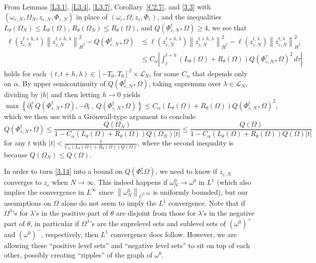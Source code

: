 \documentclass[reqno,centertags,12pt]{amsart}
\theoremstyle{definition}
\numberwithin{equation}{section}
\newcommand{\abs}[1]{\left\lvert#1\right\rvert}
\newcommand{\norm}[1]{\left\|#1\right\|}
\newcommand{\set}[1]{\left\{ #1 \right\}}
\newcommand{\eps}{\varepsilon}
\newcommand{\tht}{\theta}
\begin{document}
From Lemmas \ref{L3.1}, \ref{L3.4}, \ref{L3.7}, Corollary~\ref{C2.7}, and \eqref{3.3} with
$(\omega_{\eps,N},\Omega_{N},z_{\eps,N},\Phi_{\eps,N})$ in place of
$(\omega_{\eps},\Omega,z_{\eps}, \Phi_{\eps})$,
and the inequalities $L_{\tht}(\Omega_{N})\leq L_{\tht}(\Omega)$,
$R_{\tht}(\Omega_{N})\leq R_{\tht}(\Omega)$, and $Q(\Phi_{\eps,N*}^{t}\Omega) \geq 4$, we see that
\begin{align*}
    \ell(z_{\eps,N}^{t+h,\lambda})\norm{z_{\eps,N}^{t+h,\lambda}}_{\dot{H}^{2}}^{2}
    - Q(\Phi_{\eps,N*}^{t}\Omega)
    &\leq \ell(z_{\eps,N}^{t+h,\lambda})\norm{z_{\eps,N}^{t+h,\lambda}}_{\dot{H}^{2}}^{2}
    - \ell(z_{\eps,N}^{t,\lambda})\norm{z_{\eps,N}^{t,\lambda}}_{\dot{H}^{2}}^{2} \\
    &\leq C_{\alpha}\abs{\int_{t}^{t+h}
    (L_{\tht}(\Omega) + R_{\tht}(\Omega))Q(\Phi_{\eps,N*}^{\tau}\Omega)^{2}\,d\tau}
\end{align*}
holds for each $(t,t+h,\lambda)\in[-T_{0},T_{0}]^{2}\times\mathcal{L}_{N}$,
for some $C_{\alpha}$ that depends only on $\alpha$.
By upper semicontinuity of $Q(\Phi_{\eps,N*}^{t}\Omega)$,
taking supremum over $\lambda\in\mathcal{L}_{N}$,
dividing by $\abs{h}$ and then letting $h\to 0$ yields
\[
    \max\set{
        \partial_{t}^{+}Q(\Phi_{\eps,N*}^{t}\Omega),
        -\partial_{t-}Q(\Phi_{\eps,N*}^{t}\Omega)
    } \leq C_{\alpha}(L_{\tht}(\Omega) + R_{\tht}(\Omega))Q(\Phi_{\eps,N*}^{t}\Omega)^{2},
\]
which we then use with a Gr\"{o}nwall-type argument to conclude
\begin{equation}\label{3.14}
    Q(\Phi_{\eps,N*}^{t}\Omega) \leq \frac{Q(\Omega_{N})}
    {1 - C_{\alpha}(L_{\tht}(\Omega) + R_{\tht}(\Omega))Q(\Omega_{N})\abs{t}}
    \leq \frac{Q(\Omega)}
    {1 - C_{\alpha}(L_{\tht}(\Omega) + R_{\tht}(\Omega))Q(\Omega)\abs{t}}
\end{equation}
for any $t$ with $\abs{t} < \frac{1}{C_{\alpha}(L_{\tht}(\Omega) + R_{\tht}(\Omega))Q(\Omega)}$,
where the second inequality is because $Q(\Omega_{N}) \leq Q(\Omega)$.

In order to turn \eqref{3.14} into a bound on $Q(\Phi_{*}^{t}\Omega)$,
we need to know if $z_{\eps,N}$ converges to $z_{\eps}$ when $N\to\infty$.
This indeed happens if $\omega_{N}^{0} \to \omega^{0}$ in $L^{1}$
(which also implies the convergence in $L^{\infty}$ since
$\norm{\omega_{N}^{0}}_{\dot{C}^{0,2\alpha}}$ is uniformly bounded),
but our assumptions on $\Omega$ alone do not seem to imply the $L^{1}$ convergence.
Note that if $\Omega^{\lambda}$'s for $\lambda$'s in the positive part of $\theta$
are disjoint from those for $\lambda$'s in the negative part of $\theta$,
in particular if $\Omega^{\lambda}$'s are the suprelevel sets
and sublevel sets of $(\omega^{0})^{+}$ and $(\omega^{0})^{-}$, respectively,
then $L^{1}$ convergence does follow. However, we are allowing
these ``positive level sets'' and ``negative level sets'' to sit on top of each other,
possibly creating ``ripples'' of the graph of $\omega^{0}$.
\end{document}
